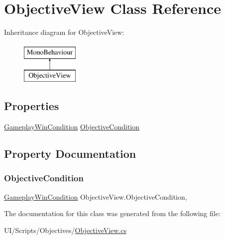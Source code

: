 \hypertarget{class_objective_view}{}\section{Objective\+View Class Reference}
\label{class_objective_view}
Inheritance diagram for Objective\+View\+:\begin{figure}[H]
\begin{center}
\leavevmode
\includegraphics[height=2.000000cm]{class_objective_view}
\end{center}
\end{figure}
\subsection*{Properties}
\begin{DoxyCompactItemize}
\item 
\mbox{\hyperlink{class_gameplay_win_condition}{Gameplay\+Win\+Condition}} \mbox{\hyperlink{class_objective_view_ae28ef02f5ffabf896ef399e0bfe15f79}{Objective\+Condition}}
\end{DoxyCompactItemize}


\subsection{Property Documentation}
\mbox{\label{class_objective_view_ae28ef02f5ffabf896ef399e0bfe15f79}} 
\subsubsection{\texorpdfstring{Objective\+Condition}{ObjectiveCondition}}
{\footnotesize\ttfamily \mbox{\hyperlink{class_gameplay_win_condition}{Gameplay\+Win\+Condition}} Objective\+View.\+Objective\+Condition\hspace{0.3cm}{\ttfamily [get]}, {\ttfamily [set]}}



The documentation for this class was generated from the following file\+:\begin{DoxyCompactItemize}
\item 
U\+I/\+Scripts/\+Objectives/\mbox{\hyperlink{_objective_view_8cs}{Objective\+View.\+cs}}\end{DoxyCompactItemize}
